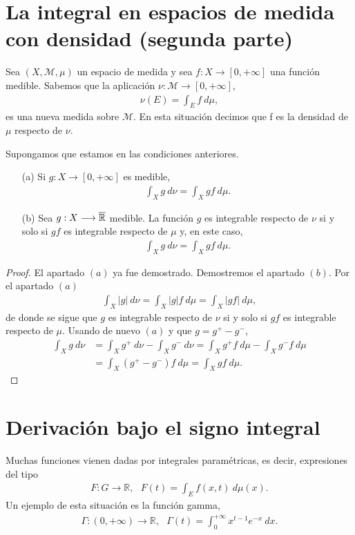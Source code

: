 \section{La integral en espacios de medida con densidad (segunda parte)}
Sea $(X, \mathcal{M},\mu)$ un espacio de medida y sea $f: X \longrightarrow [0,+\infty]$ una función medible. Sabemos que la aplicación $\nu: \mathcal{M} \longrightarrow [0,+\infty]$, 
\begin{align*}
    \nu(E) = \int_{E}{f \ d\mu},
\end{align*}
es una nueva medida sobre $\mathcal{M}$. En esta situación decimos que f es la densidad de $\mu$ respecto de $\nu$.

\begin{teo}
Supongamos que estamos en las condiciones anteriores.
\begin{enumerate}
    \item[(a)] Si $g: X \longrightarrow [0,+\infty]$ es medible,
    \begin{align*}
        \int_{X}{g \ d\nu} = \int_{X}{gf \ d\mu}.
    \end{align*}
    \item[(b)] Sea $g: X \longrightarrow \overline{\mathbb{R}}$ medible. La función $g$ es integrable respecto de $\nu$ si y solo si $gf$ es integrable respecto de $\mu$ y, en este caso,
    \begin{align*}
        \int_{X}{g \ d\nu} = \int_{X}{gf \ d\mu}.
    \end{align*}
\end{enumerate}
\end{teo}

\begin{proof}
El apartado $(a)$ ya fue demostrado. Demostremos el apartado $(b)$. Por el apartado $(a)$
\begin{align*}
    \int_{X}{|g| \ d\nu} = \int_{X}{|g|f \ d\mu} = \int_{X}{|gf| \ d\mu},
\end{align*}
de donde se sigue que $g$ es integrable respecto de $\nu$ si y solo si $gf$ es integrable respecto de $\mu$. Usando de nuevo $(a)$ y que $g = g^+ - g^-$,
\begin{align*}
    \int_{X}{g \ d\nu} &= \int_{X}{g^+ \ d\nu} - \int_{X}{g^- \ d\nu} = \int_{X}{g^+f \ d\mu} - \int_{X}{g^-f \ d\mu}\\
    &= \int_{X}{(g^+ - g^-)f \ d\mu} = \int_{X}{gf \ d\mu}.
\end{align*}
\end{proof}

\section{Derivación bajo el signo integral}
Muchas funciones vienen dadas por integrales paramétricas, es decir, expresiones del tipo
\begin{align*}
    F: G \longrightarrow \mathbb{R}, \ \ \ F(t) = \int_{E}{f(x,t) \ d\mu(x)}.
\end{align*}
Un ejemplo de esta situación es la función gamma,
\begin{align*}
    \Gamma: (0,+\infty) \longrightarrow \mathbb{R}, \ \ \ \Gamma(t) = \int_{0}^{+\infty}{x^{t-1}e^{-x} \ dx}.
\end{align*}

